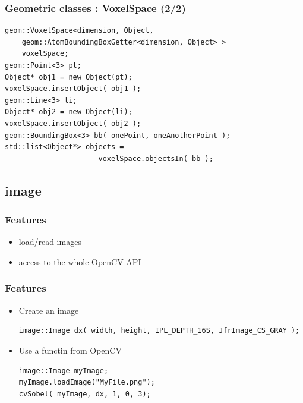 \documentclass[pdf]{beamer}
\begin{document}
\begin{frame}[fragile]
  \frametitle{Geometric classes : VoxelSpace (2/2)}

  \begin{lstlisting}
geom::VoxelSpace<dimension, Object,
    geom::AtomBoundingBoxGetter<dimension, Object> >
    voxelSpace;
geom::Point<3> pt;
Object* obj1 = new Object(pt);
voxelSpace.insertObject( obj1 );
geom::Line<3> li;
Object* obj2 = new Object(li);
voxelSpace.insertObject( obj2 );
geom::BoundingBox<3> bb( onePoint, oneAnotherPoint );
std::list<Object*> objects =
                      voxelSpace.objectsIn( bb );
  \end{lstlisting}

\end{frame}


\subsection{image}
\begin{frame}
  \frametitle{Features}
  \begin{itemize}
   \item<1-> load/read images
   \item<2-> access to the whole OpenCV API
  \end{itemize}
\end{frame}


\begin{frame}[fragile]
  \frametitle{Features}
  \begin{itemize}
   \item<1-> Create an image
\begin{lstlisting}
image::Image dx( width, height, IPL_DEPTH_16S, JfrImage_CS_GRAY );
\end{lstlisting}
    \item<2-> Use a functin from OpenCV
\begin{lstlisting}
image::Image myImage;
myImage.loadImage("MyFile.png");
cvSobel( myImage, dx, 1, 0, 3);
\end{lstlisting}
  \end{itemize}

\end{frame}
\end{document}
